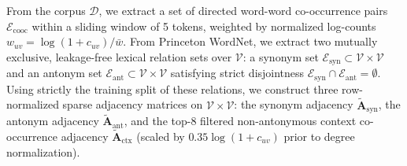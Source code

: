 \documentclass[journal]{IEEEtran}
\begin{document}
From the corpus $\mathcal{D}$, we extract a set of directed word-word co-occurrence pairs $\mathcal{E}_{\text{cooc}}$ within a sliding window of 5 tokens, weighted by normalized log-counts $w_{uv} = \log(1 + c_{uv}) / \bar{w}$. From Princeton WordNet, we extract two mutually exclusive, leakage-free lexical relation sets over $\mathcal{V}$: a synonym set $\mathcal{E}_{\text{syn}} \subset \mathcal{V} \times \mathcal{V}$ and an antonym set $\mathcal{E}_{\text{ant}} \subset \mathcal{V} \times \mathcal{V}$ satisfying strict disjointness $\mathcal{E}_{\text{syn}} \cap \mathcal{E}_{\text{ant}} = \emptyset$. Using strictly the training split of these relations, we construct three row-normalized sparse adjacency matrices on $\mathcal{V} \times \mathcal{V}$: the synonym adjacency $\tilde{\mathbf{A}}_{\text{syn}}$, the antonym adjacency $\tilde{\mathbf{A}}_{\text{ant}}$, and the top-$8$ filtered non-antonymous context co-occurrence adjacency $\tilde{\mathbf{A}}_{\text{ctx}}$ (scaled by $0.35 \log(1 + c_{uv})$ prior to degree normalization).
\end{document}
